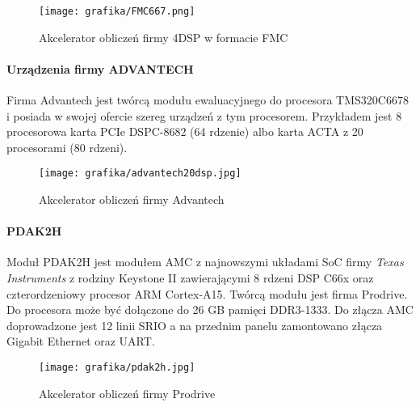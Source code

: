 	\begin{figure}[!ht]
	\begin{center}
	\texttt{[image: grafika/FMC667.png]}
	\end{center}
	\caption{Akcelerator obliczeń firmy 4DSP w formacie FMC}
	\label{4DSP}
	\end{figure}
	
	


\paragraph {Urządzenia firmy ADVANTECH} 
Firma Advantech jest twórcą modułu ewaluacyjnego do procesora TMS320C6678 i posiada w swojej ofercie szereg urządzeń z tym procesorem. Przykładem jest 8 procesorowa karta PCIe DSPC-8682 (64 rdzenie) albo karta ACTA z 20 procesorami (80 rdzeni).

	\begin{figure}[!ht]
	\begin{center}
	\texttt{[image: grafika/advantech20dsp.jpg]}
	\end{center}
	\caption{Akcelerator obliczeń firmy Advantech}
	\label{Advantech20DSP}
	\end{figure}

\paragraph {PDAK2H}
Moduł PDAK2H jest modułem AMC z najnowszymi układami SoC firmy \textit{Texas Instruments} z rodziny Keystone II zawierającymi 8 rdzeni DSP C66x oraz czterordzeniowy procesor ARM Cortex-A15. Twórcą modułu jest firma Prodrive. Do procesora może być dołączone do 26 GB pamięci DDR3-1333. Do złącza AMC doprowadzone jest 12 linii SRIO a na przednim panelu zamontowano złącza Gigabit Ethernet oraz UART.  
	\begin{figure}[!ht]
	\begin{center}
	\texttt{[image: grafika/pdak2h.jpg]}
	\end{center}
	\caption{Akcelerator obliczeń firmy Prodrive}
	\label{PRODRIVE}
	\end{figure}

